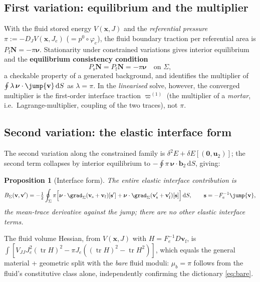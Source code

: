\documentclass[11pt]{article}
\numberwithin{equation}{section}
\newtheorem{proposition}{Proposition}[section]
\theoremstyle{remark}
\newcommand{\dS}{\,\mathrm{d}S}
\newcommand{\tr}{\operatorname{tr}}
\newcommand{\vv}{\mathbf{v}}
\newcommand{\vN}{\mathbf{N}}
\newcommand{\vs}{\mathbf{s}}
\newcommand{\vx}{\mathbf{x}}
\newcommand{\bnu}{\bm{\nu}}
\begin{document}
\subsection{First variation: equilibrium and the multiplier}

With the fluid stored energy $V(\vx,J)$ and the \emph{referential pressure}
$\pi := -D_JV(\vx,J_e)$ ($= p^0\circ\varphi_e$), the fluid boundary
traction per referential area is $P_{\mathrm{f}}\vN = -\pi\bnu$.
Stationarity under constrained variations gives interior equilibrium and
the \textbf{equilibrium consistency condition}
\begin{equation}
  P_{\mathrm{s}}\vN = P_{\mathrm{f}}\vN = -\pi\bnu \quad\text{on }\Sigma,
\end{equation}
a checkable property of a generated background, and identifies the
multiplier of $\oint\lambda\,\bnu\cdot\jump{\vv}\dS$ as $\lambda = \pi$. In
the \emph{linearised} solve, however, the converged multiplier is the
first-order interface traction $\varpi^{(1)}$ (the multiplier of a
\emph{mortar}, i.e.\ Lagrange-multiplier, coupling of the two traces), not
$\pi$.

\subsection{Second variation: the elastic interface form}

The second variation along the constrained family is $\delta^2E +
\delta E[(\mathbf{0},\mathbf{u}_2)]$; the second term collapses by interior
equilibrium to $-\oint\pi\,\bnu\cdot\mathbf{b}_2\dS$, giving:
\begin{proposition}[Interface form]
The entire elastic interface contribution is
\begin{equation}
  B_\Sigma(\vv,\vv') = -\tfrac12\oint_\Sigma\pi\Bigl[
     \bnu\cdot\grad_\Sigma(\vv_{\mathrm{s}}+\vv_{\mathrm{f}})[\vs']
   + \bnu\cdot\grad_\Sigma(\vv'_{\mathrm{s}}+\vv'_{\mathrm{f}})[\vs]\Bigr]\dS,
  \qquad \vs = -F_e^{-1}\jump{\vv},
  \label{eq:BSigma}
\end{equation}
the mean-trace derivative against the jump; there are no other elastic
interface terms.
\end{proposition}
The fluid volume Hessian, from $V(\vx,J)$ with $H = F_e^{-1}D\vv_{\mathrm{f}}$,
is $\int[V_{JJ}J_e^2(\tr H)^2 - \pi J_e((\tr H)^2 - \tr H^2)]$, which equals
the general material + geometric split with the \emph{bare} fluid moduli:
$\mu_b = \pi$ follows from the fluid's constitutive class alone,
independently confirming the dictionary \eqref{eq:bare}.
\end{document}
